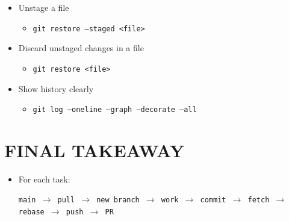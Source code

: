 \documentclass[a4paper,11pt]{article}
\begin{document}
\begin{itemize}
  \renewcommand{\labelitemi}{$\rightarrow$}

  \item Unstage a file
    \begin{itemize}
      \renewcommand{\labelitemii}{$\triangleright$}
      \item \texttt{git restore --staged <file>}
    \end{itemize}

  \item Discard unstaged changes in a file
    \begin{itemize}
      \renewcommand{\labelitemii}{$\triangleright$}
      \item \texttt{git restore <file>}
    \end{itemize}

  \item Show history clearly
    \begin{itemize}
      \renewcommand{\labelitemii}{$\triangleright$}
      \item \texttt{git log --oneline --graph --decorate --all}
    \end{itemize}

\end{itemize}

\section*{FINAL TAKEAWAY}

\begin{itemize}
  \renewcommand{\labelitemi}{$\rightarrow$}

  \item For each task:
    \begin{itemize}
      \renewcommand{\labelitemii}{$\triangleright$}
      \texttt{main $\rightarrow$ pull $\rightarrow$ new branch $\rightarrow$ work $\rightarrow$ commit $\rightarrow$ fetch $\rightarrow$ rebase $\rightarrow$ push $\rightarrow$ PR}
    \end{itemize}

\end{itemize}
\end{document}
